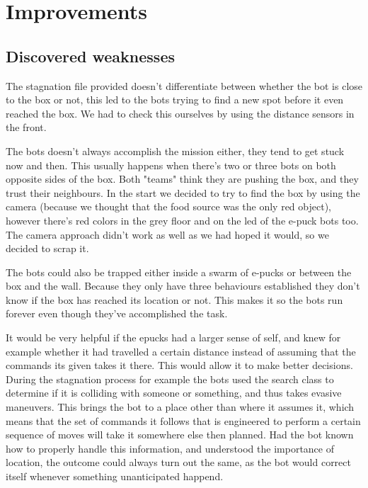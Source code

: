 \documentclass[12pt, a4paper]{article}
\begin{document}
\section{Improvements}
\subsection{Discovered weaknesses}

The stagnation file provided doesn't differentiate between whether the bot is close to the box or not, this led to the bots trying to find a new spot before it even reached the box. We had to check this ourselves by using the distance sensors in the front. 

The bots doesn't always accomplish the mission either, they tend to get stuck now and then. This usually happens when there's two or three bots on both opposite sides of the box. Both "teams" think they are pushing the box, and they trust their neighbours. 
In the start we decided to try to find the box by using the camera (because we thought that the food source was the only red object), however there's red colors in the grey floor and on the led of the e-puck bots too. The camera approach didn't work as well as we had hoped it would, so we decided to scrap it.

The bots could also be trapped either inside a swarm of e-pucks or between the box and the wall. Because they only have three behaviours established they don't know if the box has reached its location or not. This makes it so the bots run forever even though they've accomplished the task.

It would be very helpful if the epucks had a larger sense of self, and knew for example whether it had travelled a certain distance instead of assuming that the commands its given takes it there. This would allow it to make better decisions. During the stagnation process for example the bots used the search class to determine if it is colliding with someone or something, and thus takes evasive maneuvers. This brings the bot to a place other than where it assumes it, which means that the set of commands it follows that is engineered to perform a certain sequence of moves will take it somewhere else then planned. Had the bot known how to properly handle this information, and understood the importance of location, the outcome could always turn out the same, as the bot would correct itself whenever something unanticipated happend. 
\end{document}
